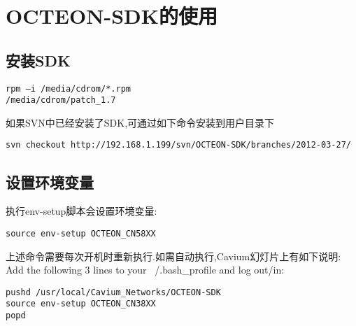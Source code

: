 \section{OCTEON-SDK的使用}

\subsection{安装SDK}
\begin{verbatim}
rpm –i /media/cdrom/*.rpm
/media/cdrom/patch_1.7
\end{verbatim}
如果SVN中已经安装了SDK,可通过如下命令安装到用户目录下
\begin{verbatim}
svn checkout http://192.168.1.199/svn/OCTEON-SDK/branches/2012-03-27/
\end{verbatim}

\subsection{设置环境变量}
执行env-setup脚本会设置环境变量:
\begin{verbatim}
source env-setup OCTEON_CN58XX
\end{verbatim}
上述命令需要每次开机时重新执行.如需自动执行,Cavium幻灯片上有如下说明:
Add the following 3 lines to your ~/.bash\_profile and log out/in:
\begin{verbatim}
pushd /usr/local/Cavium_Networks/OCTEON-SDK
source env-setup OCTEON_CN38XX
popd
\end{verbatim}




